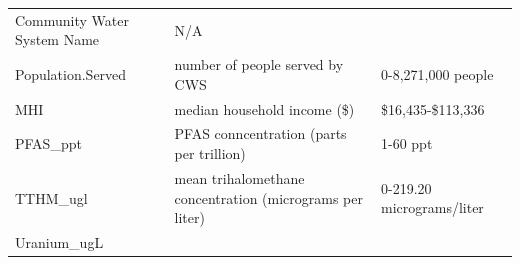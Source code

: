 \documentclass[12pt,]{article}
\begin{document}
\begin{longtable}[]{@{}lll@{}}
\begin{minipage}[t]{0.46\columnwidth}
Community Water System Name\strut
\end{minipage} & \begin{minipage}[t]{0.23\columnwidth}\raggedright
N/A\strut
\end{minipage}\tabularnewline
\begin{minipage}[t]{0.22\columnwidth}\raggedright
Population.Served\strut
\end{minipage} & \begin{minipage}[t]{0.46\columnwidth}\raggedright
number of people served by CWS\strut
\end{minipage} & \begin{minipage}[t]{0.23\columnwidth}\raggedright
0-8,271,000 people\strut
\end{minipage}\tabularnewline
\begin{minipage}[t]{0.22\columnwidth}\raggedright
MHI\strut
\end{minipage} & \begin{minipage}[t]{0.46\columnwidth}\raggedright
median household income (\$)\strut
\end{minipage} & \begin{minipage}[t]{0.23\columnwidth}\raggedright
\$16,435-\$113,336\strut
\end{minipage}\tabularnewline
\begin{minipage}[t]{0.22\columnwidth}\raggedright
PFAS\_ppt\strut
\end{minipage} & \begin{minipage}[t]{0.46\columnwidth}\raggedright
PFAS conncentration (parts per trillion)\strut
\end{minipage} & \begin{minipage}[t]{0.23\columnwidth}\raggedright
1-60 ppt\strut
\end{minipage}\tabularnewline
\begin{minipage}[t]{0.22\columnwidth}\raggedright
TTHM\_ugl\strut
\end{minipage} & \begin{minipage}[t]{0.46\columnwidth}\raggedright
mean trihalomethane concentration (micrograms per liter)\strut
\end{minipage} & \begin{minipage}[t]{0.23\columnwidth}\raggedright
0-219.20 micrograms/liter\strut
\end{minipage}\tabularnewline
\begin{minipage}[t]{0.22\columnwidth}\raggedright
Uranium\_ugL\strut
\end{minipage} & \begin{minipage}[t]{0.46\columnwidth}\raggedright

\end{minipage}
\end{longtable}
\end{document}
